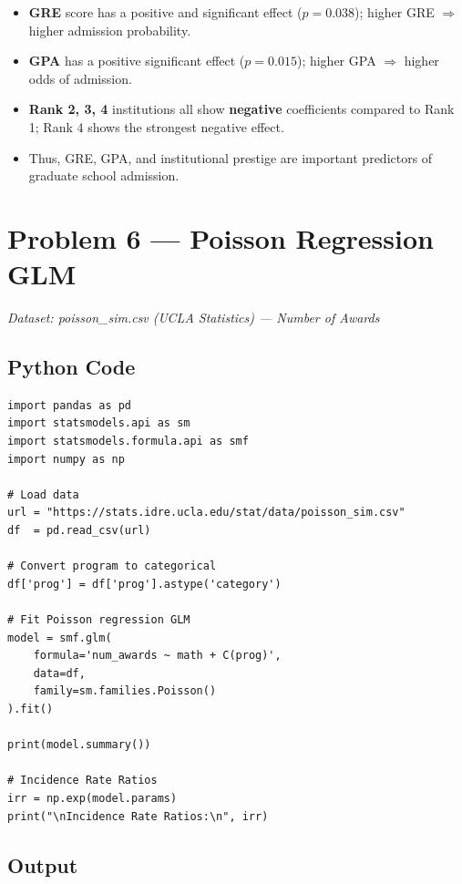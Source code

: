 \documentclass[12pt,a4paper]{article}
\begin{document}
\begin{interpbox}
\begin{itemize}[noitemsep]
  \item \textbf{GRE} score has a positive and significant effect ($p = 0.038$); higher GRE $\Rightarrow$ higher admission probability.
  \item \textbf{GPA} has a positive significant effect ($p = 0.015$); higher GPA $\Rightarrow$ higher odds of admission.
  \item \textbf{Rank 2, 3, 4} institutions all show \textbf{negative} coefficients compared to Rank 1; Rank 4 shows the strongest negative effect.
  \item Thus, GRE, GPA, and institutional prestige are important predictors of graduate school admission.
\end{itemize}
\end{interpbox}

\newpage
\section{Problem 6 — Poisson Regression GLM}

\textit{Dataset: poisson\_sim.csv (UCLA Statistics) — Number of Awards}

\subsection{Python Code}

\begin{lstlisting}
import pandas as pd
import statsmodels.api as sm
import statsmodels.formula.api as smf
import numpy as np

# Load data
url = "https://stats.idre.ucla.edu/stat/data/poisson_sim.csv"
df  = pd.read_csv(url)

# Convert program to categorical
df['prog'] = df['prog'].astype('category')

# Fit Poisson regression GLM
model = smf.glm(
    formula='num_awards ~ math + C(prog)',
    data=df,
    family=sm.families.Poisson()
).fit()

print(model.summary())

# Incidence Rate Ratios
irr = np.exp(model.params)
print("\nIncidence Rate Ratios:\n", irr)
\end{lstlisting}

\subsection{Output}
\end{document}

